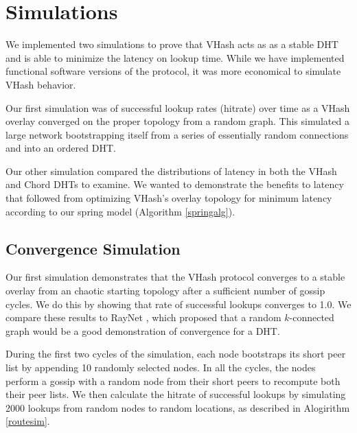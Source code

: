 \documentclass{IEEEtran}
\begin{document}



\section{Simulations}
We implemented two simulations to prove that VHash acts as as a stable DHT and is able to minimize the latency on lookup time.
While we have implemented functional software versions of the protocol, it was more economical to simulate VHash behavior.

Our first simulation was of successful lookup rates (hitrate) over time as a VHash overlay converged on the proper topology from a random graph.  
This simulated a large network bootstrapping itself from a series of essentially random connections and into an ordered DHT.
  
Our other simulation compared the distributions of latency in both the VHash and Chord DHTs to examine. 
We wanted to demonstrate the benefits to latency that followed from optimizing VHash's overlay topology for minimum latency according to our spring model (Algorithm \ref{springalg}).

\subsection{Convergence Simulation}
Our first simulation demonstrates that the VHash protocol converges to a stable overlay from an chaotic starting topology after a sufficient number of gossip cycles.  
We do this by showing that rate of successful lookups converges to 1.0.
We compare these results to RayNet \cite{raynet}, which proposed that a random $k$-connected graph would be a good demonstration of convergence for a DHT.

During the first two cycles of the simulation, each node bootstraps its short peer list by appending 10 randomly selected nodes. 
In all the cycles, the nodes perform a gossip with a random node from their short peers to recompute both their peer lists.
We then calculate the hitrate of successful lookups by simulating 2000 lookups from random nodes to random locations, as described in Alogirithm \ref{routesim}.
\end{document}
